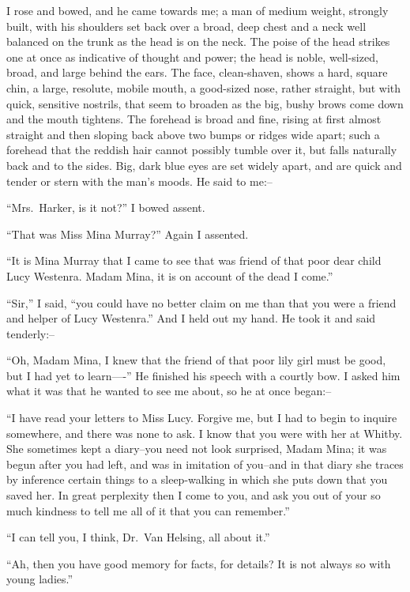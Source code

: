 \documentclass[12pt,openright]{book}
\begin{document}
I rose and bowed, and he came towards me; a man of medium weight, strongly built, with his shoulders set back over a broad, deep chest and a neck well balanced on the trunk as the head is on the neck. The poise of the head strikes one at once as indicative of thought and power; the head is noble, well-sized, broad, and large behind the ears. The face, clean-shaven, shows a hard, square chin, a large, resolute, mobile mouth, a good-sized nose, rather straight, but with quick, sensitive nostrils, that seem to broaden as the big, bushy brows come down and the mouth tightens. The forehead is broad and fine, rising at first almost straight and then sloping back above two bumps or ridges wide apart; such a forehead that the reddish hair cannot possibly tumble over it, but falls naturally back and to the sides. Big, dark blue eyes are set widely apart, and are quick and tender or stern with the man’s moods. He said to me:–

“Mrs. Harker, is it not?” I bowed assent.

“That was Miss Mina Murray?” Again I assented.

“It is Mina Murray that I came to see that was friend of that poor dear child Lucy Westenra. Madam Mina, it is on account of the dead I come.”

“Sir,” I said, “you could have no better claim on me than that you were a friend and helper of Lucy Westenra.” And I held out my hand. He took it and said tenderly:–

“Oh, Madam Mina, I knew that the friend of that poor lily girl must be good, but I had yet to learn—-” He finished his speech with a courtly bow. I asked him what it was that he wanted to see me about, so he at once began:–

“I have read your letters to Miss Lucy. Forgive me, but I had to begin to inquire somewhere, and there was none to ask. I know that you were with her at Whitby. She sometimes kept a diary–you need not look surprised, Madam Mina; it was begun after you had left, and was in imitation of you–and in that diary she traces by inference certain things to a sleep-walking in which she puts down that you saved her. In great perplexity then I come to you, and ask you out of your so much kindness to tell me all of it that you can remember.”

“I can tell you, I think, Dr. Van Helsing, all about it.”

“Ah, then you have good memory for facts, for details? It is not always so with young ladies.”
\end{document}
